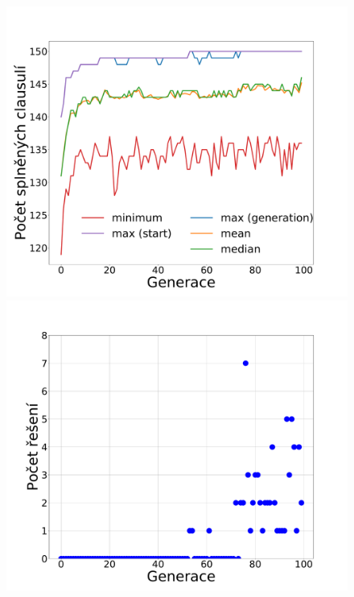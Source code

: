 \documentclass[11pt]{article}
\begin{document}
\begin{figure}
	\centering
    \begin{minipage}[c]{0.48\textwidth}
        \centering\includegraphics[width=\textwidth]{img/1c.pdf} 
    \end{minipage}
    \begin{minipage}[c]{0.48\textwidth}
        \centering \includegraphics[width=\textwidth]{img/1s.pdf} 
    \end{minipage}
    \\

\end{figure}
\end{document}
